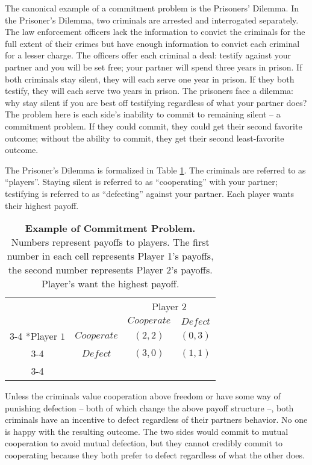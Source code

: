 \documentclass[11pt]{article}
\begin{document}
The canonical example of a commitment problem is the Prisoners' Dilemma.
In the Prisoner's Dilemma, two criminals are arrested and interrogated
separately. The law enforcement officers lack the information to convict
the criminals for the full extent of their crimes but have enough
information to convict each criminal for a lesser charge. The officers
offer each criminal a deal: testify against your partner and you will be
set free; your partner will spend three years in prison. If both
criminals stay silent, they will each serve one year in prison. If they
both testify, they will each serve two years in prison. The prisoners
face a dilemma: why stay silent if you are best off testifying
regardless of what your partner does? The problem here is each side's
inability to commit to remaining silent -- a commitment problem. If they
could commit, they could get their second favorite outcome; without the
ability to commit, they get their second least-favorite outcome.

The Prisoner's Dilemma is formalized in Table \ref{tab:comProb}. The
criminals are referred to as ``players''. Staying silent is referred to
as ``cooperating'' with your partner; testifying is referred to as
``defecting'' against your partner. Each player wants their highest
payoff.

\begin{table}[h!]
\begin{center}
\setlength{\extrarowheight}{2pt}
\begin{tabular}{cc|c|c|}
    & \multicolumn{1}{c}{} & \multicolumn{2}{c}{Player $2$}\\
    & \multicolumn{1}{c}{} & \multicolumn{1}{c}{$Cooperate$}  & \multicolumn{1}{c}{$Defect$} \\\cline{3-4}
    \multirow{2}*{Player $1$}  & $Cooperate$ & $(2,2)$ & $(0,3)$ \\\cline{3-4}
      & $Defect$ & $(3,0)$ & $(1,1)$ \\\cline{3-4}
\end{tabular}
\caption{\label{tab:comProb}\textbf{Example of Commitment Problem.} Numbers represent payoffs to players.  The first number in each cell represents Player 1's payoffs, the second number represents Player 2's payoffs.  Player's want the highest payoff.}
\end{center}
\end{table}

Unless the criminals value cooperation above freedom or have some way of
punishing defection -- both of which change the above payoff structure
--, both criminals have an incentive to defect regardless of their
partners behavior. No one is happy with the resulting outcome. The two
sides would commit to mutual cooperation to avoid mutual defection, but
they cannot credibly commit to cooperating because they both prefer to
defect regardless of what the other does.
\end{document}
